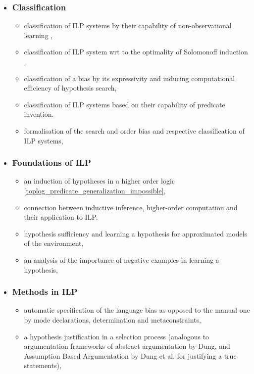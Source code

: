 \begin{itemize}
\item \subsubsection{Classification}
\begin{itemize}
\item classification of ILP systems by their capability of non-observational learning \cite{kimber2012learning},
\item classification of ILP system wrt to the optimality of Solomonoff induction \cite{solomonoff1964formal},
\item classification of a bias by its expressivity and inducing computational efficiency of hypothesis search,
\item classification of ILP systems based on their capability of predicate invention.
\item formalisation of the search and order bias and respective classification of ILP systems,
\end{itemize}
\item \subsubsection{Foundations of ILP}
\begin{itemize}
\item an induction of hypotheses in a higher order logic \ref{toplog_predicate_generalization_impossible},
\item connection between inductive inference, higher-order computation \cite{longley2000notions} and their application to ILP.
\item hypothesis sufficiency and learning a hypothesis for approximated models of the environment,
\item an analysis of the importance of negative examples in learning a hypothesis,
\end{itemize}
\item \subsubsection{Methods in ILP}
\begin{itemize}
\item automatic specification of the language bias as opposed to the manual one by mode declarations, determination and metaconstraints,
\item a hypothesis justification in a selection process (analogous to argumentation frameworks of abstract argumentation by Dung\cite{dung1995acceptability}, and Assumption Based Argumentation by Dung et al.\cite{dung2009assumption} for justifying a true statements),
\end{itemize}
\end{itemize}
